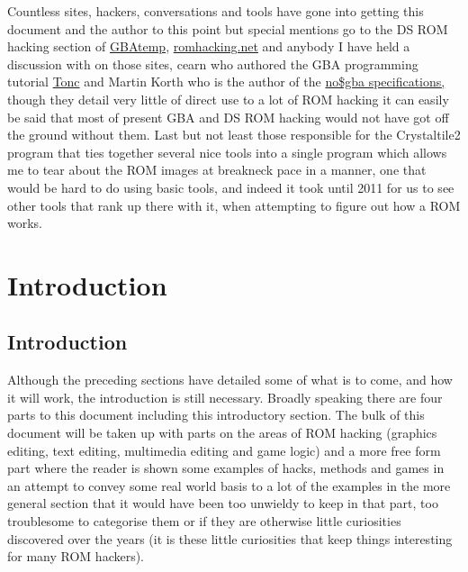 \documentclass[
]{book}
\begin{document}
Countless sites, hackers, conversations and tools have gone into getting this document and the author to this point but special mentions go to the DS ROM hacking section of \href{https://gbatemp.net/forum/41-nds-rom-hacking-and-translations/}{GBAtemp}, \href{http://www.romhacking.net/}{romhacking.net} and anybody I have held a discussion with on those sites, cearn who authored the GBA programming tutorial \href{http://www.coranac.com/tonc/text/toc.htm}{Tonc} and Martin Korth who is the author of the \href{http://problemkaputt.de/gbatek.htm}{no\$gba specifications,} though they detail very little of direct use to a lot of ROM hacking it can easily be said that most of present GBA and DS ROM hacking would not have got off the ground without them. Last but not least those responsible for the Crystaltile2 program that ties together several nice tools into a single program which allows me to tear about the ROM images at breakneck pace in a manner, one that would be hard to do using basic tools, and indeed it took until 2011 for us to see other tools that rank up there with it, when attempting to figure out how a ROM works.

\hypertarget{part-introduction}{%
\part{Introduction}\label{part-introduction}}

\hypertarget{introduction}{%
\chapter*{Introduction}\label{introduction}}

Although the preceding sections have detailed some of what is to come, and how it will work, the introduction is still necessary. Broadly speaking there are four parts to this document including this introductory section. The bulk of this document will be taken up with parts on the areas of ROM hacking (graphics editing, text editing, multimedia editing and game logic) and a more free form part where the reader is shown some examples of hacks, methods and games in an attempt to convey some real world basis to a lot of the examples in the more general section that it would have been too unwieldy to keep in that part, too troublesome to categorise them or if they are otherwise little curiosities discovered over the years (it is these little curiosities that keep things interesting for many ROM hackers).
\end{document}
